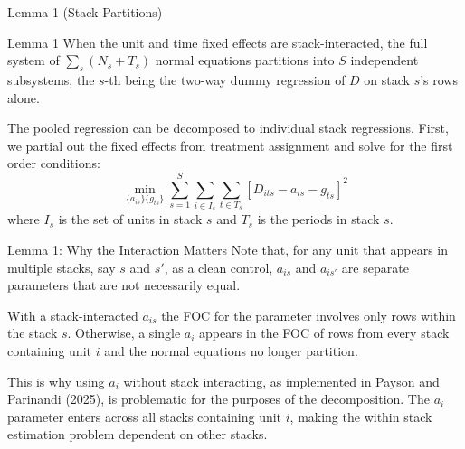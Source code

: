 \documentclass[11pt]{beamer}
\begin{document}
\begin{frame}{Lemma 1 (Stack Partitions)}
    \begin{block}{Lemma 1}
        When the unit and time fixed effects are stack-interacted, the full
        system of $\sum_s (N_s + T_s)$ normal equations partitions into $S$
        independent subsystems, the $s$-th being the two-way dummy regression of
        $D$ on stack $s$'s rows alone.
    \end{block}

    \vspace{3mm}

    The pooled regression can be decomposed to individual stack regressions.
    First, we partial out the fixed effects from treatment assignment and solve
    for the first order conditions:
    \[
        \min_{\{a_{is}\}\{g_{ts}\}}
        \sum_{s=1}^{S} \sum_{i \in I_s} \sum_{t \in T_s}
        \left[ D_{its} - a_{is} - g_{ts} \right]^2
    \]
    where $I_s$ is the set of units in stack $s$ and $T_s$ is the periods in
    stack $s$.
\end{frame}

\begin{frame}{Lemma 1: Why the Interaction Matters}
    Note that, for any unit that appears in multiple stacks, say $s$ and $s'$,
    as a clean control, $a_{is}$ and $a_{is'}$ are separate parameters that are
    not necessarily equal.

    \vspace{3mm}

    With a stack-interacted $a_{is}$ the FOC for the parameter involves only
    rows within the stack $s$. Otherwise, a single $a_i$ appears in the FOC of
    rows from every stack containing unit $i$ and the normal equations no longer
    partition.

    \vspace{5mm}

    \footnotesize
    This is why using $a_i$ without stack interacting, as implemented in Payson
    and Parinandi (2025), is problematic for the purposes of the decomposition.
    The $a_i$ parameter enters across all stacks containing unit $i$, making the
    within stack estimation problem dependent on other stacks.
\end{frame}
\end{document}
